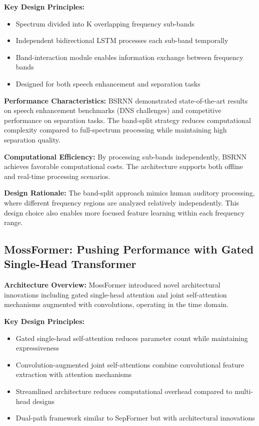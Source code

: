 \documentclass[conference]{IEEEtran}
\begin{document}
\textbf{Key Design Principles:}
\begin{itemize}
    \item Spectrum divided into K overlapping frequency sub-bands
    \item Independent bidirectional LSTM processes each sub-band temporally
    \item Band-interaction module enables information exchange between frequency bands
    \item Designed for both speech enhancement and separation tasks
\end{itemize}

\textbf{Performance Characteristics:} BSRNN demonstrated state-of-the-art results on speech enhancement benchmarks (DNS challenges) and competitive performance on separation tasks. The band-split strategy reduces computational complexity compared to full-spectrum processing while maintaining high separation quality.

\textbf{Computational Efficiency:} By processing sub-bands independently, BSRNN achieves favorable computational costs. The architecture supports both offline and real-time processing scenarios.

\textbf{Design Rationale:} The band-split approach mimics human auditory processing, where different frequency regions are analyzed relatively independently. This design choice also enables more focused feature learning within each frequency range.

\subsection{MossFormer: Pushing Performance with Gated Single-Head Transformer}

\textbf{Architecture Overview:} MossFormer \cite{zhao2023mossformer} introduced novel architectural innovations including gated single-head attention and joint self-attention mechanisms augmented with convolutions, operating in the time domain.

\textbf{Key Design Principles:}
\begin{itemize}
    \item Gated single-head self-attention reduces parameter count while maintaining expressiveness
    \item Convolution-augmented joint self-attentions combine convolutional feature extraction with attention mechanisms
    \item Streamlined architecture reduces computational overhead compared to multi-head designs
    \item Dual-path framework similar to SepFormer but with architectural innovations
\end{itemize}
\end{document}
